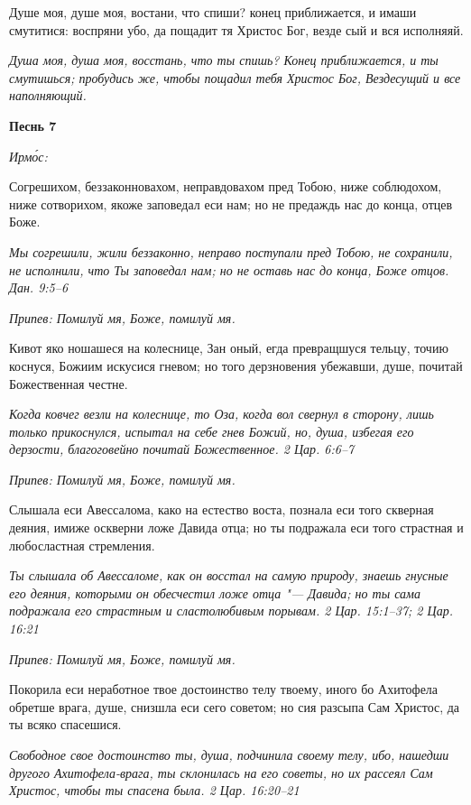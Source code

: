 Душе моя, душе моя, востани, что спиши? конец приближается, и имаши смутитися: воспряни убо, да пощадит тя Христос Бог, везде сый и вся исполняяй.


\itshape Душа моя, душа моя, восстань, что ты спишь? Конец приближается, и ты смутишься; пробудись же, чтобы пощадил тебя Христос Бог, Вездесущий и все наполняющий.\normalfont{}





\bfseries Песнь 7\normalfont{}


\itshape Ирмо́с:\normalfont{}


Согрешихом, беззаконновахом, неправдовахом пред Тобою, ниже соблюдохом, ниже сотворихом, якоже заповедал еси нам; но не предаждь нас до конца, отцев Боже.


\itshape Мы согрешили, жили беззаконно, неправо поступали пред Тобою, не сохранили, не исполнили, что Ты заповедал нам; но не оставь нас до конца, Боже отцов. Дан. 9:5–6\normalfont{}


\itshape Припев:\normalfont{} Помилуй мя, Боже, помилуй мя.


Кивот яко ношашеся на колеснице, Зан оный, егда превращшуся тельцу, точию коснуся, Божиим искусися гневом; но того дерзновения убежавши, душе, почитай Божественная честне.


\itshape Когда ковчег везли на колеснице, то Оза, когда вол свернул в сторону, лишь только прикоснулся, испытал на себе гнев Божий, но, душа, избегая его дерзости, благоговейно почитай Божественное. 2 Цар. 6:6–7\normalfont{}


\itshape Припев:\normalfont{} Помилуй мя, Боже, помилуй мя.


Слышала еси Авессалома, како на естество воста, познала еси того скверная деяния, имиже оскверни ложе Давида отца; но ты подражала еси того страстная и любосластная стремления.


\itshape Ты слышала об Авессаломе, как он восстал на самую природу, знаешь гнусные его деяния, которыми он обесчестил ложе отца "--- Давида; но ты сама подражала его страстным и сластолюбивым порывам. 2 Цар. 15:1–37; 2 Цар. 16:21\normalfont{}


\itshape Припев:\normalfont{} Помилуй мя, Боже, помилуй мя.


Покорила еси неработное твое достоинство телу твоему, иного бо Ахитофела обретше врага, душе, снизшла еси сего советом; но сия разсыпа Сам Христос, да ты всяко спасешися.


\itshape Свободное свое достоинство ты, душа, подчинила своему телу, ибо, нашедши другого Ахитофела-врага, ты склонилась на его советы, но их рассеял Сам Христос, чтобы ты спасена была. 2 Цар. 16:20–21\normalfont{}


